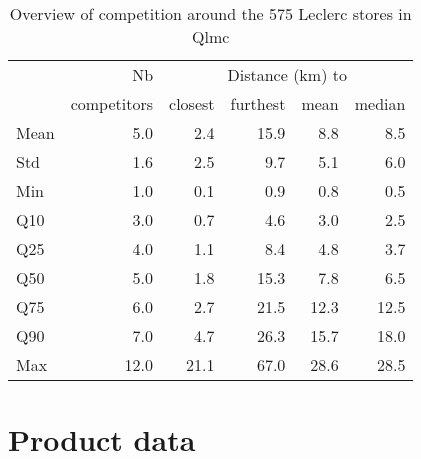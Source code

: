 \documentclass[english]{article}
\begin{document}
\begin{table}[H]
\renewcommand{\arraystretch}{0.7}%
\caption{Overview of competition around the 575 Leclerc stores in Qlmc}\label{tab:qlmc_comp}
\small
\begin{tabular}{lr|rrrr}
\toprule
\toprule
{}         & Nb          &    \multicolumn{4}{c}{Distance (km) to} \\
{}         & competitors &    closest & furthest & mean & median \\
\midrule
Mean  &   5.0 &   2.4 &  15.9 &   8.8 &     8.5 \\
Std   &   1.6 &   2.5 &   9.7 &   5.1 &     6.0 \\
Min   &   1.0 &   0.1 &   0.9 &   0.8 &     0.5 \\
Q10   &   3.0 &   0.7 &   4.6 &   3.0 &     2.5 \\
Q25   &   4.0 &   1.1 &   8.4 &   4.8 &     3.7 \\
Q50   &   5.0 &   1.8 &  15.3 &   7.8 &     6.5 \\
Q75   &   6.0 &   2.7 &  21.5 &  12.3 &    12.5 \\
Q90   &   7.0 &   4.7 &  26.3 &  15.7 &    18.0 \\
Max   &  12.0 &  21.1 &  67.0 &  28.6 &    28.5 \\
\bottomrule
\bottomrule
\end{tabular}
\end{table}

\newpage

\section{Product data}
\end{document}
